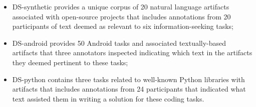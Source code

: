 \begin{itemize}
    \item \acs{DS-synthetic} provides a unique corpus of 20 natural language artifacts associated
    with open-source projects that includes annotations from 20 participants of text deemed as relevant to six information-seeking tasks;
    
    \item \acs{DS-android} provides 50 Android tasks and associated textually-based artifacts
    that three annotators inspected indicating which text in the artifacts they deemed pertinent to these tasks;

    \item \acs{DS-python} contains three tasks related to well-known Python libraries with artifacts
    that includes annotations from 24 participants that indicated what text assisted them in writing a solution for these coding tasks.
\end{itemize}